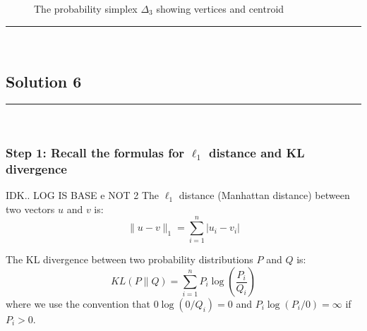 \documentclass{article}
\begin{document}
\begin{figure}[h]
\caption{The probability simplex $\Delta_3$ showing vertices and centroid}
\end{figure}

\noindent\rule{\textwidth}{0.4pt}\\
\newpage

\subsection*{Solution 6}
\noindent\rule{\textwidth}{0.4pt}\\

\subsubsection*{Step 1: Recall the formulas for $\ell_1$ distance and KL divergence}
\parbox{\textwidth}{
    IDK.. LOG IS BASE e NOT 2
The $\ell_1$ distance (Manhattan distance) between two vectors $u$ and $v$ is:
$$\|u - v\|_1 = \sum_{i=1}^{n} |u_i - v_i|$$

The KL divergence between two probability distributions $P$ and $Q$ is:
$$KL(P \| Q) = \sum_{i=1}^{n} P_i \log\left(\frac{P_i}{Q_i}\right)$$
where we use the convention that $0 \log(0/Q_i) = 0$ and $P_i \log(P_i/0) = \infty$ if $P_i > 0$.
}
\end{document}
